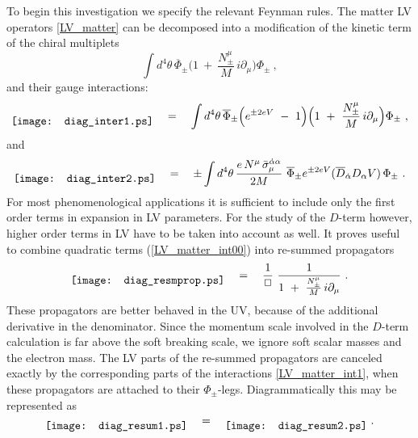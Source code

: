 \documentclass[12pt]{revtex4}
\begin{document}
To begin this investigation we specify the relevant Feynman rules. 
The matter LV operators \eqref{LV_matter} can be decomposed into
a modification of the kinetic term of the chiral multiplets 
%
\begin{equation} 
\int d^4\theta\, 
\overline{\Phi}_\pm 
\Big( 1 ~+~ \frac{N_\pm^\mu}{M} \, i \partial_\mu  \Big) 
\Phi_\pm~, 
\label{LV_matter_int00}
\end{equation}
%
and their gauge interactions:
%
\begin{equation} 
\raisebox{-1ex}{\texttt{[image: diag\_inter1.ps]}}
\quad = \quad 
\int d^4\theta\, 
\overline{\Phi}_\pm 
\Big(  e^{\pm 2 e V} ~-~ 1 \Big) 
\Big( 1 ~+~ \frac{N_\pm^\mu}{M} \, i \partial_\mu  \Big) 
\Phi_\pm~, 
\label{LV_matter_int1}
\end{equation}
%
and 
%
\begin{equation}
\raisebox{-1ex}{\texttt{[image: diag\_inter2.ps]}}
\quad = \quad 
\pm \int d^4\theta\, 
\frac {e \, N^\mu \, \bar\sigma_\mu^{\dot\alpha\alpha}}{2M} ~ 
\overline{\Phi}_\pm 
e^{\pm 2eV} 
( \overline{D}_{\dot\alpha} D_\alpha V) \, 
\Phi_\pm~. 
\label{LV_matter_int2}
\end{equation} 
%
For most  phenomenological applications it is sufficient to include
only the first order terms in expansion in LV parameters. For 
the study of the $D$-term however, higher order terms in LV have to be
taken into account as well. It proves useful to combine quadratic
terms (\ref{LV_matter_int00}) into re-summed  propagators 
%
\begin{equation} 
\raisebox{-1ex}{\texttt{[image: diag\_resmprop.ps]}}
\quad = \quad 
\frac 1{\Box}~  \frac 1{1 ~+~  \frac{ N_\pm^\mu} M \, i\partial_\mu}~. 
\end{equation} 
%
These propagators are better behaved in the UV, because of the additional 
derivative in the denominator. Since the momentum scale involved in
the $D$-term calculation is far above the soft breaking scale, we
ignore soft scalar masses and the electron mass. The LV parts of the
re-summed propagators are canceled exactly by the corresponding parts of
the interactions \eqref{LV_matter_int1}, when these propagators are
attached to their $\Phi_\pm$-legs. Diagrammatically this may be 
represented as  
%
\begin{equation}
\raisebox{-1ex}{\texttt{[image: diag\_resum1.ps]}}
\quad = \quad 
\raisebox{-1ex}{\texttt{[image: diag\_resum2.ps]}}
~. 
\label{ResummedPropVer}
\end{equation}
\end{document}
